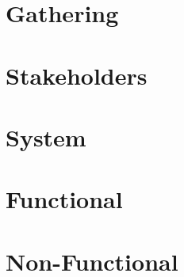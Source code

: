 \section{Gathering}


\section{Stakeholders}


\section{System}


\section{Functional}


\section{Non-Functional}
